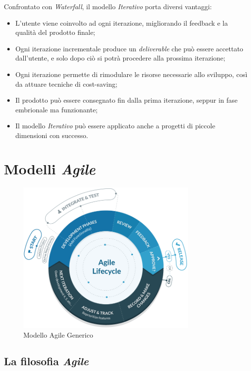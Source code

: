 \documentclass[a4paper,12pt]{report}
\begin{document}
				Confrontato con \emph{Waterfall}, il modello \emph{Iterativo} porta diversi vantaggi:
				\begin{itemize}
					\item L'utente viene coinvolto ad ogni iterazione, migliorando il feedback e la qualità del prodotto finale;
					\item Ogni iterazione incrementale produce un \emph{deliverable} che può essere accettato dall'utente, e solo dopo ciò si potrà procedere alla prossima iterazione;
					\item Ogni iterazione permette di rimodulare le risorse necessarie allo sviluppo, così da attuare tecniche di cost-saving;
					\item Il prodotto può essere consegnato fin dalla prima iterazione, seppur in fase embrionale ma funzionante;
					\item Il modello \emph{Iterativo} può essere applicato anche a progetti di piccole dimensioni con successo.
				\end{itemize}
	
		\section{Modelli \emph{Agile}}
	
			\begin{figure}[h]
				\centering
				\includegraphics[width=0.8\textwidth]{agile}
				\caption{Modello Agile Generico}
				\label{fig:agile_generic}
			\end{figure}
	
			\subsection{La filosofia \emph{Agile}}
				
\end{document}
